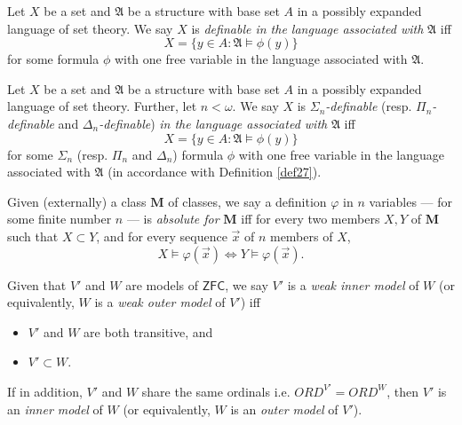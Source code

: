 \documentclass[12pt]{article}
\numberwithin{equation}{section}
\begin{document}
\begin{defi}
Let $X$ be a set and $\mathfrak{A}$ be a structure with base set $A$ in a possibly expanded language of set theory. We say $X$ is \emph{definable in the language associated with} $\mathfrak{A}$ iff $$X = \{y \in A : \mathfrak{A} \models \phi(y)\}$$ for some formula $\phi$ with one free variable in the language associated with $\mathfrak{A}$.
\end{defi}

\begin{defi}
Let $X$ be a set and $\mathfrak{A}$ be a structure with base set $A$ in a possibly expanded language of set theory. Further, let $n < \omega$. We say $X$ is $\Sigma_n$\emph{-definable} (resp. $\Pi_n$\emph{-definable} and $\Delta_n$\emph{-definable}) \emph{in the language associated with} $\mathfrak{A}$ iff $$X = \{y \in A : \mathfrak{A} \models \phi(y)\}$$ for some $\Sigma_n$ (resp. $\Pi_n$ and $\Delta_n$) formula $\phi$ with one free variable in the language associated with $\mathfrak{A}$ (in accordance with Definition \ref{def27}).
\end{defi}

\begin{defi}
Given (externally) a class $\mathbf{M}$ of classes, we say a definition $\varphi$ in $n$ variables --- for some finite number $n$ --- is \emph{absolute for} $\mathbf{M}$ iff for every two members $X, Y$ of $\mathbf{M}$ such that $X \subset Y$, and for every sequence $\Vec{x}$ of $n$ members of $X$,
\begin{equation*}
    X \models \varphi(\Vec{x}) \iff Y \models \varphi(\Vec{x}) \text{.}
\end{equation*}
\end{defi}

\begin{defi}\label{inoutmodels}
Given that $V'$ and $W$ are models of $\mathsf{ZFC}$, we say $V'$ is a \emph{weak inner model} of $W$ (or equivalently, $W$ is a \emph{weak outer model} of $V'$) iff
\begin{itemize}
    \item $V'$ and $W$ are both transitive, and
    \item $V' \subset W$.
\end{itemize}
If in addition, $V'$ and $W$ share the same ordinals i.e. $ORD^{V'} = ORD^W$, then $V'$ is an \emph{inner model} of $W$ (or equivalently, $W$ is an \emph{outer model} of $V'$).
\end{defi}
\end{document}

